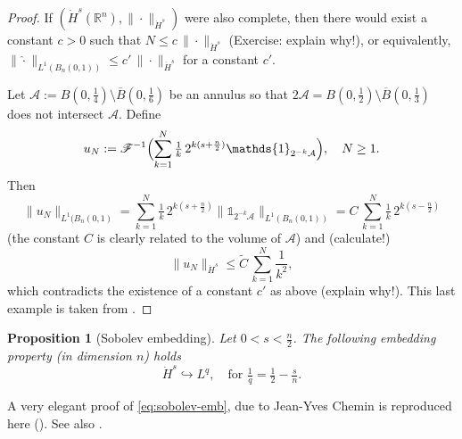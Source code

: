 \documentclass[a4paper, 12pt]{article}
\theoremstyle{plain}
\newtheorem{proposition}{Proposition}[section]
\theoremstyle{definition}
\theoremstyle{remark}
\numberwithin{equation}{section}
\begin{document}
\begin{proof}
If $(\dot H^s({\mathds{R}}^n), \|\cdot\|_{\dot H^s})$ were also complete, then there would exist a constant $c>0$ such that 
$N\le c \,\|\cdot\|_{\dot H^s}$ (Exercise: explain why!), or equivalently,  $\|\hat{\cdot}\|_{L^1(B_n(0,1))}\le c'\, \|\cdot\|_{\dot H^s}$
for a constant $c'$. 

\noindent
Let ${\mathcal{A}}:=B(0,\frac{1}{4})\setminus \overline{B}(0,\frac{1}{6})$ be an annulus so that 
$2{\mathcal{A}}=B(0,\frac{1}{2})\setminus \overline{B}(0,\frac{1}{3})$ does not intersect ${\mathcal{A}}$. Define
\[
u_N:={\mathscr{F}}^{-1}\Bigl(\sum_{k=1}^N \tfrac{1}{k}\,2^{k(s+\frac{n}{2})} {\mathds{1}}_{2^{-k}{\mathcal{A}}}\Bigr),
\quad N\ge 1.
\]
Then 
\[
\|\widehat{u_N}\|_{L^1(B_n(0,1)} = \sum_{k=1}^N \tfrac{1}{k}\,2^{k(s+\frac{n}{2})} \|{\mathds{1}}_{2^{-k}{\mathcal{A}}}\|_{L^1(B_n(0,1))}
=C\, \sum_{k=1}^N \tfrac{1}{k}\,2^{k(s-\frac{n}{2})}
\]
(the constant $C$ is clearly related to the volume of ${\mathcal{A}}$) and (calculate!)
\[
\|u_N\|_{\dot H^s} \le \tilde{C}\, \sum_{k=1}^N \frac{1}{k^2},
\]
which contradicts the existence of a constant $c'$ as above (explain why!). This last example is taken from \cite[Prop.~1.34]{BCD11}.
\end{proof}

\begin{proposition}[Sobolev embedding]
Let $0<s<\frac{n}{2}$.
The following embedding property (in dimension $n$) holds
%
\begin{equation}
\label{eq:sobolev-emb}
\dot H^s\hookrightarrow L^q,\quad \mbox{for }\tfrac{1}{q}=\tfrac{1}{2}-\tfrac{s}{n}.
\end{equation}
%
\end{proposition}

A very elegant proof of \eqref{eq:sobolev-emb}, due to Jean-Yves Chemin is reproduced here (\cite[Lemma~1.1]{Da20}). 
See also \cite[Thm~1.38]{BCD11}.
\end{document}
